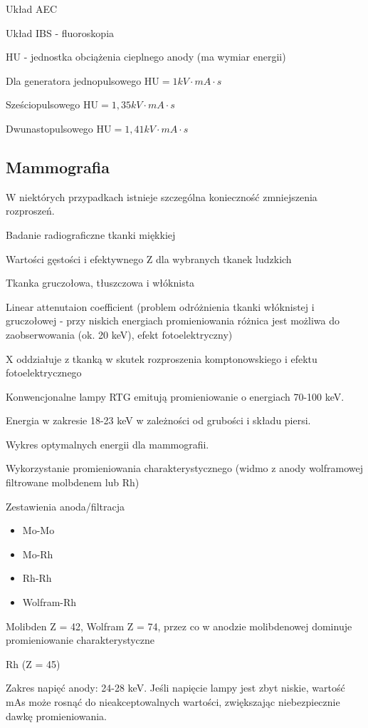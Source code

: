 \documentclass{article}
\begin{document}
Układ AEC

Układ IBS - fluoroskopia

HU - jednostka obciążenia cieplnego anody (ma wymiar energii)

Dla generatora jednopulsowego
$\mathrm{HU} = 1 kV \cdot mA \cdot s$

Sześciopulsowego
$\mathrm{HU} = 1,35 kV \cdot mA \cdot s$

Dwunastopulsowego
$\mathrm{HU} = 1,41 kV \cdot mA \cdot s$

\subsection{Mammografia}

W niektórych przypadkach istnieje szczególna konieczność zmniejszenia rozproszeń.

Badanie radiograficzne tkanki miękkiej

Wartości gęstości i efektywnego Z dla wybranych tkanek ludzkich

Tkanka gruczołowa, tłuszczowa i włóknista

Linear attenutaion coefficient (problem odróżnienia tkanki włóknistej i gruczołowej - przy niskich energiach promieniowania różnica jest możliwa do zaobserwowania (ok. 20 keV), efekt fotoelektryczny)

X oddziałuje z tkanką w skutek rozproszenia komptonowskiego i efektu fotoelektrycznego

Konwencjonalne lampy RTG emitują promieniowanie o energiach 70-100 keV.

Energia w zakresie 18-23 keV w zależności od grubości i składu piersi.

Wykres optymalnych energii dla mammografii.

Wykorzystanie promieniowania charakterystycznego (widmo z anody wolframowej filtrowane molbdenem lub Rh)

Zestawienia anoda/filtracja
\begin{itemize}
    \item Mo-Mo
    \item Mo-Rh
    \item Rh-Rh
    \item Wolfram-Rh 
\end{itemize}

Molibden Z = 42, Wolfram Z = 74, przez co w anodzie molibdenowej dominuje promieniowanie charakterystyczne

Rh (Z = 45)

Zakres napięć anody: 24-28 keV. Jeśli napięcie lampy jest zbyt niskie, wartość mAs może rosnąć do nieakceptowalnych wartości, zwiększając niebezpiecznie dawkę promieniowania.
\end{document}

